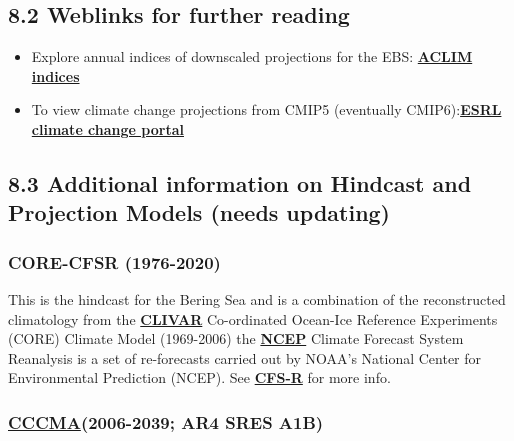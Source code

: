 \documentclass[
]{article}
\begin{document}
\hypertarget{weblinks-for-further-reading}{%
\subsection{8.2 Weblinks for further
reading}\label{weblinks-for-further-reading}}

\begin{itemize}
\item
  Explore annual indices of downscaled projections for the EBS:
  \href{https://kholsman.shinyapps.io/aclim/}{\textbf{ACLIM indices}}
\item
  To view climate change projections from CMIP5 (eventually
  CMIP6):\href{https://www.esrl.noaa.gov/psd/ipcc/ocn/}{\textbf{ESRL
  climate change portal }}
\end{itemize}

\hypertarget{additional-information-on-hindcast-and-projection-models-needs-updating}{%
\subsection{8.3 Additional information on Hindcast and Projection Models
(needs
updating)}\label{additional-information-on-hindcast-and-projection-models-needs-updating}}

\hypertarget{core-cfsr-1976-2020}{%
\subsubsection{CORE-CFSR (1976-2020)}\label{core-cfsr-1976-2020}}

This is the hindcast for the Bering Sea and is a combination of the
reconstructed climatology from the
\href{http://portal.aoos.org/bering-sea.php\#module-metadata/5626a0b6-7d79-11e3-ac17-00219bfe5678/0756e6c2-a8e2-40af-aa3d-22051ed68067}{\textbf{CLIVAR}}
Co-ordinated Ocean-Ice Reference Experiments (CORE) Climate Model
(1969-2006) the
\href{http://portal.aoos.org/bering-sea.php\#module-metadata/f8cb79f6-7d59-11e3-a6ee-00219bfe5678/2deb2eca-f3f5-4eda-a132-112468711de7}{\textbf{NCEP}}
Climate Forecast System Reanalysis is a set of re-forecasts carried out
by NOAA's National Center for Environmental Prediction (NCEP). See
\href{http://cfs.ncep.noaa.gov/cfsr/}{\textbf{CFS-R}} for more info.

\hypertarget{cccma2006-2039-ar4-sres-a1b}{%
\subsubsection{\texorpdfstring{\href{http://www.cccma.ec.gc.ca/diagnostics/cgcm3/cgcm3.shtml}{CCCMA}(2006-2039;
AR4 SRES
A1B)}{CCCMA(2006-2039; AR4 SRES A1B)}}\label{cccma2006-2039-ar4-sres-a1b}}
\end{document}
